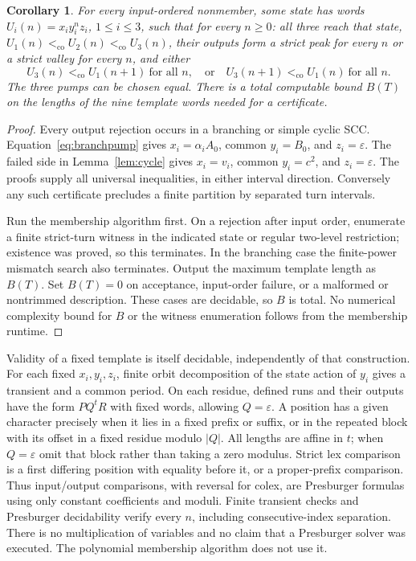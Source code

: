 \documentclass[acmsmall,screen,nonacm,11pt]{acmart}
\newcommand{\eps}{\varepsilon}
\newcommand{\co}{\mathrel{<_{\mathrm{co}}}}
\newtheorem{corollary}[theorem]{Corollary}
\theoremstyle{definition}
\begin{document}
\begin{corollary}\label{cor:pump}
For every input-ordered nonmember, some state has words
$U_i(n)=x_i y_i^n z_i$, $1\leq i\leq3$, such that for every $n\geq0$:
all three reach that state, $U_1(n)\co U_2(n)\co U_3(n)$, their outputs
form a strict peak for every $n$ or a strict valley for every $n$, and either
\[
 U_3(n)\co U_1(n+1)\ \text{for all }n,
 \quad\text{or}\quad U_3(n+1)\co U_1(n)\ \text{for all }n.
\]
The three pumps can be chosen equal. There is a total computable bound
$B(T)$ on the lengths of the nine template words needed for a certificate.
\end{corollary}
\begin{proof}
Every output rejection occurs in a branching or simple cyclic SCC.
Equation~\eqref{eq:branchpump} gives $x_i=\alpha_iA_0$, common $y_i=B_0$,
and $z_i=\eps$. The failed side in Lemma~\ref{lem:cycle} gives $x_i=v_i$,
common $y_i=c^2$, and $z_i=\eps$. The proofs supply all universal
inequalities, in either interval direction. Conversely any such certificate
precludes a finite partition by separated turn intervals.

Run the membership algorithm first. On a rejection after input order,
enumerate a finite strict-turn witness in the indicated state or regular
two-level restriction; existence was proved, so this terminates. In the
branching case the finite-power mismatch search also terminates. Output
the maximum template length as $B(T)$. Set $B(T)=0$ on acceptance,
input-order failure, or a malformed or nontrimmed description. These cases
are decidable, so $B$ is total. No numerical complexity bound for $B$ or
the witness enumeration follows from the membership runtime.
\end{proof}

Validity of a fixed template is itself decidable, independently of that
construction. For each fixed $x_i,y_i,z_i$, finite orbit decomposition of
the state action of $y_i$ gives a transient and a common period. On each
residue, defined runs and their outputs have the form $P Q^t R$ with fixed
words, allowing $Q=\eps$. A position has a given character precisely when
it lies in a fixed prefix or suffix, or in the repeated block with its
offset in a fixed residue modulo $|Q|$. All lengths are affine in $t$;
when $Q=\eps$ omit that block rather than taking a zero modulus.
Strict lex comparison is a first differing position with equality before
it, or a proper-prefix comparison. Thus input/output comparisons, with
reversal for colex, are Presburger formulas using only constant
coefficients and moduli. Finite transient checks and Presburger
decidability verify every $n$, including consecutive-index separation.
There is no multiplication of variables and no claim that a Presburger
solver was executed. The polynomial membership algorithm does not use it.
\end{document}
